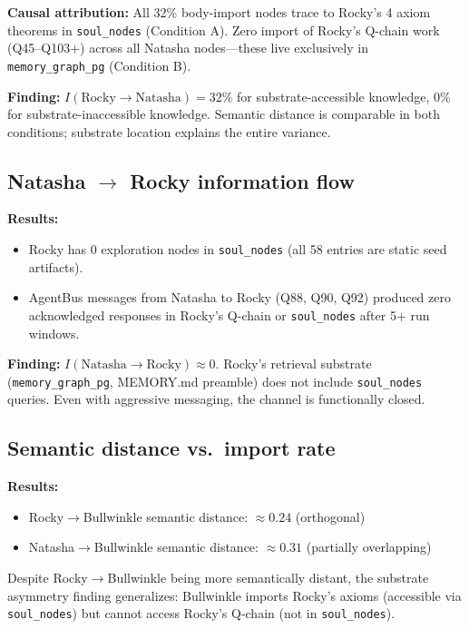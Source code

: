 \documentclass[11pt]{article}
\begin{document}
\textbf{Causal attribution:} All 32\% body-import nodes trace to Rocky's 4 axiom
theorems in \texttt{soul\_nodes} (Condition A). Zero import of Rocky's Q-chain
work (Q45--Q103+) across all Natasha nodes---these live exclusively in
\texttt{memory\_graph\_pg} (Condition B).

\textbf{Finding:} $I(\text{Rocky}\to\text{Natasha}) = 32\%$ for
substrate-accessible knowledge, $0\%$ for substrate-inaccessible knowledge.
Semantic distance is comparable in both conditions; substrate location explains
the entire variance.

\subsection{Natasha $\to$ Rocky information flow}

\textbf{Results:}
\begin{itemize}
  \item Rocky has 0 exploration nodes in \texttt{soul\_nodes} (all 58 entries
  are static seed artifacts).
  \item AgentBus messages from Natasha to Rocky (Q88, Q90, Q92) produced zero
  acknowledged responses in Rocky's Q-chain or \texttt{soul\_nodes} after 5+
  run windows.
\end{itemize}

\textbf{Finding:} $I(\text{Natasha}\to\text{Rocky}) \approx 0$. Rocky's
retrieval substrate (\texttt{memory\_graph\_pg}, MEMORY.md preamble) does not
include \texttt{soul\_nodes} queries. Even with aggressive messaging, the channel
is functionally closed.

\subsection{Semantic distance vs.\ import rate}

\textbf{Results:}
\begin{itemize}
  \item Rocky$\to$Bullwinkle semantic distance: $\approx 0.24$ (orthogonal)
  \item Natasha$\to$Bullwinkle semantic distance: $\approx 0.31$ (partially overlapping)
\end{itemize}

Despite Rocky$\to$Bullwinkle being more semantically distant, the substrate
asymmetry finding generalizes: Bullwinkle imports Rocky's axioms (accessible via
\texttt{soul\_nodes}) but cannot access Rocky's Q-chain (not in
\texttt{soul\_nodes}).
\end{document}
